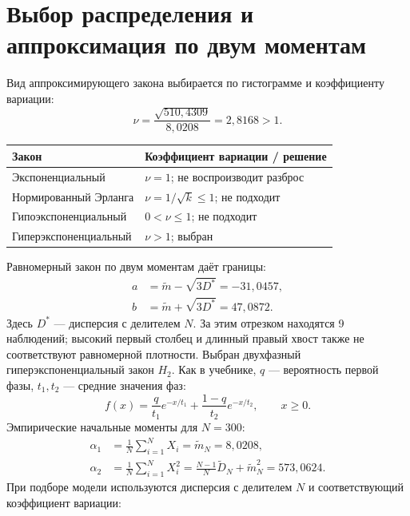 \documentclass[12pt,a4paper]{article}
\newcommand{\mm}{\widetilde m}
\newcommand{\DD}{\widetilde D}
\begin{document}
\section{Выбор распределения и аппроксимация по двум моментам}
Вид аппроксимирующего закона выбирается по гистограмме и коэффициенту вариации:
\begin{equation*}
\nu=\frac{\sqrt{510{,}4309}}{8{,}0208}=2{,}8168>1.
\end{equation*}
\begin{center}\small\renewcommand{\arraystretch}{1.15}
\begin{tabular}{|l|l|}\hline
Закон & Коэффициент вариации / решение\\\hline
Экспоненциальный & $\nu=1$; не воспроизводит разброс\\
Нормированный Эрланга & $\nu=1/\sqrt{k}\leq1$; не подходит\\
Гипоэкспоненциальный & $0<\nu\leq1$; не подходит\\
Гиперэкспоненциальный & $\nu>1$; выбран\\\hline
\end{tabular}\end{center}
Равномерный закон по двум моментам даёт границы:
\begin{equation*}
\begin{aligned}
a&=\mm-\sqrt{3D^*}=-31{,}0457,\\
b&=\mm+\sqrt{3D^*}=47{,}0872.
\end{aligned}
\end{equation*}
Здесь $D^*$ --- дисперсия с делителем $N$.
За этим отрезком находятся 9 наблюдений; высокий первый столбец и длинный правый хвост также не соответствуют равномерной плотности.
Выбран двухфазный гиперэкспоненциальный закон $H_2$. Как в учебнике, $q$ --- вероятность первой фазы, $t_1,t_2$ --- средние значения фаз:
\begin{equation}
f(x)=\frac{q}{t_1}e^{-x/t_1}+\frac{1-q}{t_2}e^{-x/t_2},\qquad x\geq0.\label{eq:h2}
\end{equation}
\newpage
Эмпирические начальные моменты для $N=300$:
\begin{equation}
\begin{aligned}
\widehat\alpha_1&=\frac1N\sum_{i=1}^{N}X_i=\mm_N=8{,}0208,\\
\widehat\alpha_2&=\frac1N\sum_{i=1}^{N}X_i^2
=\frac{N-1}{N}\DD_N+\mm_N^2=573{,}0624.
\end{aligned}\label{eq:rawmoments}
\end{equation}
При подборе модели используются дисперсия с делителем $N$ и соответствующий коэффициент вариации:
\end{document}
